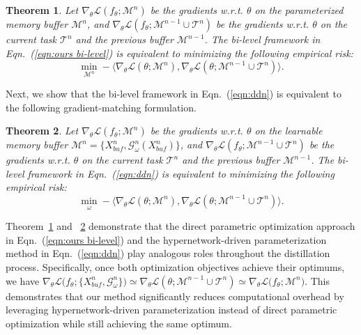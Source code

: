 \documentclass[table, xcdraw]{article}
\theoremstyle{plain}
\newtheorem{theorem}{Theorem}[section]
\theoremstyle{definition}
\theoremstyle{remark}
\begin{document}
\begin{theorem}
Let $\nabla_\theta \mathcal{L}(f_\theta; \mathcal{M}^n)$  be the gradients w.r.t. $\theta$ on the parameterized memory buffer $\mathcal M^n$, and $\nabla_\theta \mathcal{L}(f_\theta; \mathcal{M}^{n-1} \cup \mathcal{T}^n)$ be the gradients w.r.t. $\theta$ on the current task $\mathcal T^n$ and the previous buffer $\mathcal M^{n-1}$. The bi-level framework in Eqn.~(\ref{eqn:ours bi-level}) is equivalent to minimizing the following empirical risk:
\begin{equation}
\min_{\mathcal M^n}-\bigl\langle \nabla_\theta \mathcal{L}(\theta; \mathcal M^n),\nabla_\theta \mathcal{L}(\theta; \mathcal{M}^{n-1} \cup \mathcal{T}^n) \bigr\rangle.
\label{eqn:theorem_1}
\end{equation}
\label{thm:bi_level_ours}
\vspace{-4mm}
\end{theorem}
Next, we show that the bi-level framework in Eqn.~(\ref{eqn:ddn}) is equivalent to the following gradient-matching formulation.
\begin{theorem}
Let $\nabla_\theta \mathcal{L}(f_\theta; \mathcal{M}^n)$ be the gradients w.r.t. $\theta$ on the learnable memory buffer $\mathcal M^n=\bigl\{{X_{buf}^n, \mathcal G_{\omega}^n(X_{buf}^n)}\bigr\}$, and $\nabla_\theta \mathcal{L}(f_\theta; \mathcal{M}^{n-1} \cup \mathcal{T}^n)$ be the gradients w.r.t. $\theta$ on the current task $\mathcal T^n$ and the previous buffer $\mathcal M^{n-1}$. The bi-level framework in Eqn.~(\ref{eqn:ddn}) is equivalent to minimizing the following empirical risk:
\begin{equation}
\min_{\omega}-\bigl\langle \nabla_\theta \mathcal{L}(\theta; \mathcal M^n),\nabla_\theta \mathcal{L}(\theta; \mathcal{M}^{n-1} \cup \mathcal{T}^n) \bigr\rangle.
\label{eqn:theorem_2}
\end{equation}
\label{thm:bi_level_ours2}
\vspace{-6mm}
\end{theorem}
Theorem~\ref{thm:bi_level_ours} and ~\ref{thm:bi_level_ours2} demonstrate that the direct parametric optimization approach in Eqn.~(\ref{eqn:ours bi-level}) and the hypernetwork-driven parameterization method in Eqn.~(\ref{eqn:ddn}) play analogous roles throughout the distillation process. Specifically, once both optimization objectives achieve their optimums, we have $\nabla_\theta \mathcal{L}\bigl(f_\theta; \{X_{buf}^n, \mathcal{G}^n_\omega\}\bigr) \simeq \nabla_\theta \mathcal{L}(\theta; \mathcal{M}^{n-1} \cup \mathcal{T}^n) \simeq \nabla_\theta \mathcal{L}\bigl(f_\theta; \mathcal{M}^n\bigr)$. This demonstrates that our method significantly reduces computational overhead by leveraging hypernetwork-driven parameterization instead of direct parametric optimization while still achieving the same optimum. 
\end{document}

